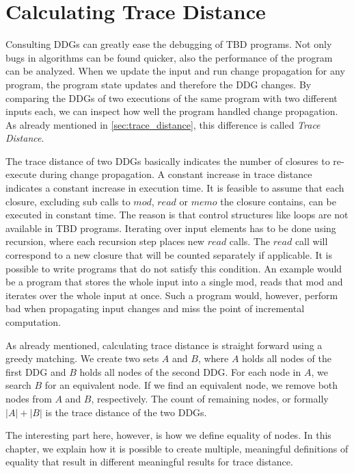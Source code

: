 \chapter{Calculating Trace Distance}
\label{ch:calc_trace_distance}

Consulting DDGs can greatly ease the debugging of TBD programs. Not only bugs in algorithms can be found quicker, also the performance of the program can be analyzed. When we update the input and run change propagation for any program, the program state updates and therefore the DDG changes. By comparing the DDGs of two executions of the same program with two different inputs each, we can inspect how well the program handled change propagation. As already mentioned in \ref{sec:trace_distance}, this difference is called \textit{Trace Distance}. 

The trace distance of two DDGs basically indicates the number of closures to re-execute during change propagation. A constant increase in trace distance indicates a constant increase in execution time. It is feasible to assume that each closure, excluding sub calls to $mod$, $read$ or $memo$ the closure contains, can be executed in constant time. The reason is that control structures like loops are not available in TBD programs. Iterating over input elements has to be done using recursion, where each recursion step places new $read$ calls. The $read$ call will correspond to a new closure that will be counted separately if applicable. It is possible to write programs that do not satisfy this condition. An example would be a program that stores the whole input into a single mod, reads that mod and iterates over the whole input at once. Such a program would, however, perform bad when propagating input changes and miss the point of incremental computation.

As already mentioned, calculating trace distance is straight forward using a greedy matching. We create two sets $A$ and $B$, where $A$ holds all nodes of the first DDG and $B$ holds all nodes of the second DDG. For each node in $A$, we search $B$ for an equivalent node. If we find an equivalent node, we remove both nodes from $A$ and $B$, respectively. The count of remaining nodes, or formally $|A| + |B|$ is the trace distance of the two DDGs. 

The interesting part here, however, is how we define equality of nodes. In this chapter, we explain how it is possible to create multiple, meaningful definitions of equality that result in different meaningful results for trace distance. 

